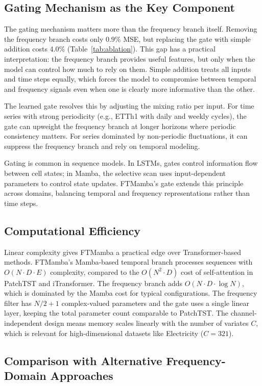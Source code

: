 \documentclass[electronics,article,submit,pdftex,moreauthors]{Definitions/mdpi}
\begin{document}
\subsection{Gating Mechanism as the Key Component}

The gating mechanism matters more than the frequency branch itself. Removing the frequency branch costs only 0.9\% MSE, but replacing the gate with simple addition costs 4.0\% (Table~\ref{tab:ablation}). This gap has a practical interpretation: the frequency branch provides useful features, but only when the model can control how much to rely on them. Simple addition treats all inputs and time steps equally, which forces the model to compromise between temporal and frequency signals even when one is clearly more informative than the other.

The learned gate resolves this by adjusting the mixing ratio per input. For time series with strong periodicity (e.g., ETTh1 with daily and weekly cycles), the gate can upweight the frequency branch at longer horizons where periodic consistency matters. For series dominated by non-periodic fluctuations, it can suppress the frequency branch and rely on temporal modeling.

Gating is common in sequence models. In LSTMs, gates control information flow between cell states; in Mamba, the selective scan uses input-dependent parameters to control state updates. FTMamba's gate extends this principle across domains, balancing temporal and frequency representations rather than time steps.

\subsection{Computational Efficiency}

Linear complexity gives FTMamba a practical edge over Transformer-based methods. FTMamba's Mamba-based temporal branch processes sequences with $O(N \cdot D \cdot E)$ complexity, compared to the $O(N^2 \cdot D)$ cost of self-attention in PatchTST and iTransformer. The frequency branch adds $O(N \cdot D \cdot \log N)$, which is dominated by the Mamba cost for typical configurations. The frequency filter has $N/2+1$ complex-valued parameters and the gate uses a single linear layer, keeping the total parameter count comparable to PatchTST. The channel-independent design means memory scales linearly with the number of variates $C$, which is relevant for high-dimensional datasets like Electricity ($C=321$).

\subsection{Comparison with Alternative Frequency-Domain Approaches}
\end{document}
